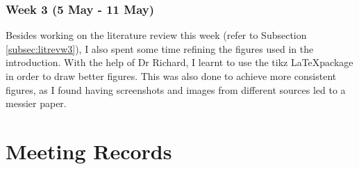 \documentclass[a4paper, 12pt]{extreport}
\begin{document}
			\subsection{Week 3 (5 May - 11 May)}\label{subsec:revw3}
				
				Besides working on the literature review this week (refer to Subsection \ref{subsec:litrevw3}), I also spent some time refining the figures used in the introduction. With the help of Dr Richard, I learnt to use the tikz \LaTeX package in order to draw better figures. This was also done to achieve more consistent figures, as I found having screenshots and images from different sources led to a messier paper.
		
	\nocite{*}
	\printbibliography[heading={bibnumbered}, title={Bibliography}]
	
	\chapter{Meeting Records}
		
		
		
		
		
		
		
		
		
\end{document}
